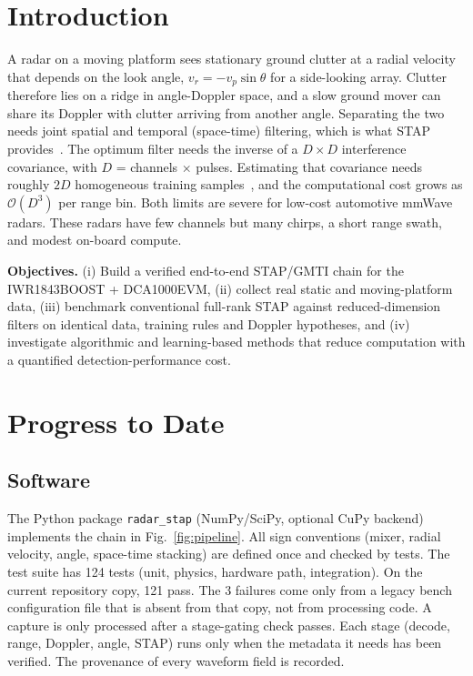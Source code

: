 \documentclass[conference]{IEEEtran}
\begin{document}
\section{Introduction}
A radar on a moving platform sees stationary ground clutter at a radial velocity that depends on
the look angle, $v_r=-v_p\sin\theta$ for a side-looking array. Clutter therefore lies on a ridge in
angle-Doppler space, and a slow ground mover can share its Doppler with clutter arriving from
another angle. Separating the two needs joint spatial and temporal (space-time) filtering, which
is what STAP provides~\cite{brennan1973,ward1994,klemm2006}. The optimum filter needs the inverse of a
$D\times D$ interference covariance, with $D$ = channels $\times$ pulses. Estimating that covariance
needs roughly $2D$ homogeneous training samples~\cite{rmb1974}, and the computational cost grows
as $\mathcal O(D^3)$ per range bin. Both limits are severe for low-cost automotive mmWave radars.
These radars have few channels but many chirps, a short range swath, and modest on-board compute.

\textbf{Objectives.} (i) Build a verified end-to-end STAP/GMTI chain for the IWR1843BOOST +
DCA1000EVM, (ii) collect real static and moving-platform data, (iii) benchmark conventional
full-rank STAP against reduced-dimension filters on identical data, training rules and Doppler
hypotheses, and (iv) investigate algorithmic and learning-based methods that reduce computation
with a quantified detection-performance cost.

\section{Progress to Date}
\subsection{Software}
The Python package \texttt{radar\_stap} (NumPy/SciPy, optional CuPy backend) implements the
chain in Fig.~\ref{fig:pipeline}. All sign conventions (mixer, radial velocity, angle, space-time
stacking) are defined once and checked by tests. The test suite has 124 tests (unit, physics,
hardware path, integration). On the current repository copy, 121 pass. The 3 failures come only
from a legacy bench configuration file that is absent from that copy, not from processing code.
A capture is only processed after a stage-gating check passes. Each stage (decode, range,
Doppler, angle, STAP) runs only when the metadata it needs has been verified. The provenance of
every waveform field is recorded.
\end{document}

